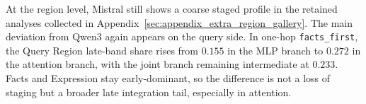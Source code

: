 \documentclass[11pt]{article}
\begin{document}
At the region level, Mistral still shows a coarse staged profile in the retained analyses collected in Appendix~\ref{sec:appendix_extra_region_gallery}. The main deviation from Qwen3 again appears on the query side. In one-hop \texttt{facts\_first}, the Query Region late-band share rises from $0.155$ in the MLP branch to $0.272$ in the attention branch, with the joint branch remaining intermediate at $0.233$. Facts and Expression stay early-dominant, so the difference is not a loss of staging but a broader late integration tail, especially in attention.

\end{document}
